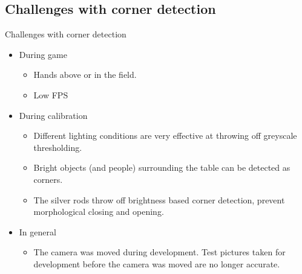\subsection{Challenges with corner detection}\label{subsection:program_challenges}
\begin{frame}{Challenges with corner detection}
    \begin{itemize}
        \item During game
        \begin{itemize}
            \item Hands above or in the field.
            \item Low FPS
        \end{itemize}
        \item During calibration
        \begin{itemize}
            \item Different lighting conditions are very effective at throwing off greyscale thresholding.
            \item Bright objects (and people) surrounding the table can be detected as corners.
            \item The silver rods throw off brightness based corner detection, prevent morphological closing and opening.
        \end{itemize}
        \item In general
        \begin{itemize}
            \item The camera was moved during development. Test pictures taken for development before the camera was moved are no longer accurate.
        \end{itemize}
    \end{itemize}
\end{frame}

